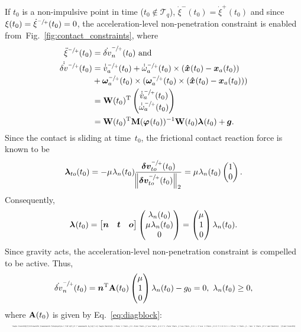 \documentclass[global,twocolumn]{svjour}
\let\vec\bm
\let\stdvec\vec
\newcommand{\vecdot}[1]{\dot{\stdvec{#1}}}
\newcommand{\vectoscalar}[1]{{\renewcommand{\vec}{}#1}}
\newcommand{\vectovecdot}[1]{{\renewcommand{\vec}{\vecdot}#1}}
\newcommand{\vectoscalardot}[1]{{\renewcommand{\vec}{\dot}#1}}
\newcommand{\mat}[1]{{\bf #1}}
\newcommand{\dvect}[2]{\ensuremath{\begin{pmatrix}#1\\#2\end{pmatrix}}}
\newcommand{\tvect}[3]{\ensuremath{\begin{pmatrix}#1\\#2\\#3\end{pmatrix}}}
\newcommand{\transp}{{\mathrm{T}}}
\newcommand{\cross}{\times}
\newcommand{\pos}    [1]{\ensuremath{\vec{x}_{#1}}}
\newcommand{\orient} [1]{\ensuremath{\vec{\varphi}_{#1}}}
\newcommand{\prepostlinvel} [1]{\ensuremath{\vec{v}_{#1}^{\sfrac{-}{+}}}}
\newcommand{\prepostangvel} [1]{\ensuremath{\vec{\omega}_{#1}^{\sfrac{-}{+}}}}
\newcommand{\mass}   [1]{\ensuremath{m_{#1}}}
\newcommand{\prepostlinveldot}[1]{\ensuremath{\vectovecdot{\prepostlinvel{#1}}}}
\newcommand{\prepostangveldot}[1]{\ensuremath{\vectovecdot{\prepostangvel{#1}}}}
\newcommand{\cof}[1]{\ensuremath{\mu_{#1}}}
\newcommand{\contactforce}[1]{\ensuremath{\vec{\lambda}_{#1}}}
\newcommand{\contactforceCFn}[1]{\ensuremath{\vectoscalar{\contactforce{\ifstrequal{#1}{}{n}{#1,n}}}}}
\newcommand{\contactforceCFto}[1]{\ensuremath{\contactforce{\ifstrequal{#1}{}{to}{#1,to}}}}
\newcommand{\prepostrelvel}[1]{\ensuremath{{\vec{\delta v}_{#1}^{\sfrac{-}{+}}}}}
\newcommand{\prepostrelveldot}[1]{\ensuremath{\vectovecdot{\prepostrelvel{#1}}}}
\newcommand{\prepostrelveldotCFn}[1]{\ensuremath{\vectoscalardot{\prepostrelvel{\ifstrequal{#1}{}{n}{#1,n}}}}}
\newcommand{\prepostrelvelCFto}[1]{\ensuremath{\prepostrelvel{\ifstrequal{#1}{}{to}{#1,to}}}}
\newcommand{\contactpos}    [1]{\ensuremath{\vec{\hat{x}}_{#1}}}
\renewcommand{\figref}[1]{Fig.~\ref{#1}}
\newcommand{\shrinkeqnnew}[2]{\resizebox{#1\linewidth}{!}{\begin{varwidth}[t]{2\linewidth}\ensuremath{\displaystyle{#2}}\end{varwidth}}}
\begin{document}
	If $t_0$ is a non-impulsive point in time ($t_0 \not \in \mathcal{T}_q$), $\dot{\xi}^-(t_0) = \dot{\xi}^+(t_0)$ and
	since $\xi(t_0) = \dot{\xi}^{\sfrac{-}{+}}(t_0) = 0$, the acceleration-level non-penetration constraint
	is enabled from~\figref{fig:contact_constraints}, where
	\begin{equation*}
		\begin{split}
			\ddot{\xi}^{\sfrac{-}{+}}(t_0) & = \prepostrelveldotCFn{}(t_0)\ \text{and}\\
			\prepostrelveldot{}(t_0) & = \prepostlinveldot{a}(t_0) + \prepostangveldot{a}(t_0) \cross (\contactpos{}(t_0) - \pos{a}(t_0)) \\
			                         & + \prepostangvel{a}(t_0) \cross (\prepostangvel{a}(t_0) \cross (\contactpos{}(t_0) - \pos{a}(t_0))) \\
									 & = \mat{W}(t_0)^\transp \dvect{\prepostlinveldot{a}(t_0)}{\prepostangveldot{a}(t_0)} \\
									 & = \mat{W}(t_0)^\transp \mat{M}(\orient{}(t_0))^{-1} \mat{W}(t_0) \contactforce{}(t_0) + \vec g.
		\end{split}
	\end{equation*}
	Since the contact is sliding at time~$t_0$, the frictional contact reaction force is known to be
	\begin{equation*}
		\contactforceCFto{}(t_0) = -\cof{} \contactforceCFn{}(t_0) \frac{\prepostrelvelCFto{}(t_0)}{\norm{\prepostrelvelCFto{}(t_0)}_2} = \cof{} \contactforceCFn{}(t_0) \dvect{1}{0}.
	\end{equation*}
	Consequently,
	\begin{equation*}
		\contactforce{}(t_0) = \begin{bmatrix} \vec n & \vec t & \vec o \end{bmatrix} \tvect{\contactforceCFn{}(t_0)}{\cof{} \contactforceCFn{}(t_0)}{0} = \tvect{\cof{}}{1}{0} \contactforceCFn{}(t_0).
	\end{equation*}
	Since gravity acts, the acceleration-level non-penetration constraint is
	compelled to be active. Thus,
	\begin{equation*}
		\prepostrelveldotCFn{}(t_0) = \vec n^\transp \mat{A}(t_0) \tvect{\cof{}}{1}{0} \contactforceCFn{}(t_0) - g_0 = 0,\ \contactforceCFn{}(t_0) \geq 0,
	\end{equation*}
	where $\mat{A}(t_0)$ is given by Eq.~\eqref{eq:diagblock}:
	\begin{equation*}
		\shrinkeqnnew{1}{
		\mat{A}(t_0) = \mass{a}^{-1} \begin{bmatrix}1 + 3\sin^2 \theta_0 & -3\sin \theta_0 \cos \theta_0 & 0 \\ -3\sin \theta_0 \cos \theta_0 & 1 + 3 \cos^2 \theta_0 & 0 \\ 0 & 0 & 1 + 3(\cos^2 \theta_0 - \sin^2 \theta_0)^2 \end{bmatrix}.
		}
	\end{equation*}
\end{document}
